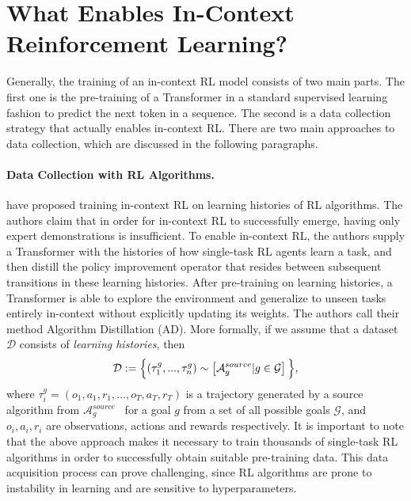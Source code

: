 \documentclass{article}
\theoremstyle{plain}
\theoremstyle{definition}
\theoremstyle{remark}
\begin{document}
\section{What Enables In-Context Reinforcement Learning?}
\label{sec:backgrnd}
Generally, the training of an in-context RL model consists of two main parts. The first one is the pre-training of a Transformer in a standard supervised learning fashion to predict the next token in a sequence. The second is a data collection strategy that actually enables in-context RL. There are two main approaches to data collection, which are discussed in the following paragraphs.
\paragraph{Data Collection with RL Algorithms.}
\citet{laskin2022context} have proposed training in-context RL on learning histories of RL algorithms. The authors claim that in order for in-context RL to successfully emerge, having only expert demonstrations is insufficient. To enable in-context RL, the authors supply a Transformer with the histories of how single-task RL agents learn a task, and then distill the policy improvement operator that resides between subsequent transitions in these learning histories. After pre-training on learning histories, a Transformer is able to explore the environment and generalize to unseen tasks entirely in-context without explicitly updating its weights. The authors call their method Algorithm Distillation (AD).
More formally, if we assume that a dataset $\mathcal{D}$ consists of \textit{learning histories}, then
$$
\mathcal{D}: = \Bigl\{ \left( \tau_1^g, ..., \tau_n^g \right) \sim \left[ \mathcal{A}^{source}_g | g \in \mathcal{G} \right] \Bigl\},
$$
where $\tau_i^g = \left( o_1, a_1, r_1, ..., o_T, a_T, r_T  \right)$ is a trajectory generated by a source algorithm from $\mathcal{A}^{source}_g$ \ for a goal $g$ from a set of all possible goals $\mathcal{G}$, and $o_i, a_i, r_i$ are observations, actions and rewards respectively.
It is important to note that the above approach makes it necessary to train thousands of single-task RL algorithms in order to successfully obtain suitable pre-training data. This data acquisition process can prove challenging, since RL algorithms are prone to instability in learning and are sensitive to hyperparameters.
\end{document}
